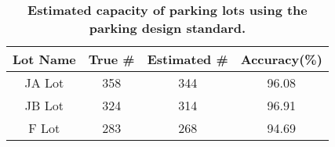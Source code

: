 \begin{table}[t]
\begin{threeparttable}
{\small
\begin{tabularx}{\columnwidth}{cccc}
{\normalsize{\textbf{Lot Name}}} & 
{\normalsize{\textbf{True \# }}} & 
{\normalsize{\textbf{Estimated \# }}} &
{\normalsize{\textbf{Accuracy(\%)}}} \\
\toprule
JA Lot & 358 & 344 & 96.08 \\
JB Lot & 324 & 314 & 96.91 \\
F Lot & 283 & 268 & 94.69 \\
\end{tabularx}
}
\caption{\textbf{Estimated capacity of parking lots using the parking design standard.}}
\label{table-capacity}
\end{threeparttable}
\end{table}
